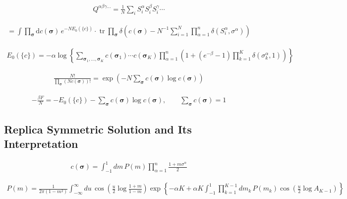 \documentclass{article}
\begin{document}
\begin{align*}
Q^{\alpha \beta \gamma \ldots}=\frac{1}{N} \sum_{i} S_{i}^{\alpha} S_{i}^{\beta} S_{i}^{\gamma} \cdots \tag{9.47}
\end{align*}

\begin{align*}
[Z^n] = \int \prod_{\boldsymbol{\sigma}} \mathrm{d}c(\boldsymbol{\sigma}) \, e^{-N E_0(\{c\})}
\cdot \operatorname{tr} \prod_{\boldsymbol{\sigma}} \delta \left( c(\boldsymbol{\sigma}) - N^{-1} \sum_{i=1}^{N} \prod_{\alpha=1}^{n} \delta(S_i^{\alpha}, \sigma^{\alpha}) \right)
\tag{9.48}
\end{align*}


\begin{align*}
E_0(\{c\}) = -\alpha \log \left\{ \sum_{\boldsymbol{\sigma}_1, \ldots, \boldsymbol{\sigma}_K} c(\boldsymbol{\sigma}_1) \cdots c(\boldsymbol{\sigma}_K) \prod_{\alpha=1}^{n} \left( 1 + \left( e^{-\beta} - 1 \right) \prod_{k=1}^{K} \delta \left( \sigma_k^{\alpha}, 1 \right) \right) \right\} \tag{9.49}
\end{align*}

\begin{align*}
\frac{N!}{\prod_{\boldsymbol{\sigma}}(N c(\boldsymbol{\sigma}))!}=\exp \left(-N \sum_{\boldsymbol{\sigma}} c(\boldsymbol{\sigma}) \log c(\boldsymbol{\sigma})\right) \tag{9.50}
\end{align*}

\begin{align*}
  -\frac{\beta F}{N}=-E_{0}(\{c\})-\sum_{\boldsymbol{\sigma}} c(\boldsymbol{\sigma}) \log c(\boldsymbol{\sigma}), \qquad \sum_{\boldsymbol{\sigma}} c(\boldsymbol{\sigma})=1 \tag{9.51}
\end{align*}

\subsection{Replica Symmetric Solution and Its Interpretation}

\begin{align*}
c(\boldsymbol{\sigma}) = \int_{-1}^{1} dm \, P(m) \prod_{\alpha=1}^{n} \frac{1 + m \sigma^{\alpha}}{2} \tag{9.52}
\end{align*}

\begin{align*}
P(m) = \frac{1}{2\pi(1 - m^2)} \int_{-\infty}^{\infty} du \, \cos \left( \frac{u}{2} \log \frac{1+m}{1-m} \right) \exp \left\{ -\alpha K + \alpha K \int_{-1}^{1} \prod_{k=1}^{K-1} dm_k \, P(m_k) \cos \left( \frac{u}{2} \log A_{K-1} \right) \right\} \tag{9.53}
\end{align*}
\end{document}

